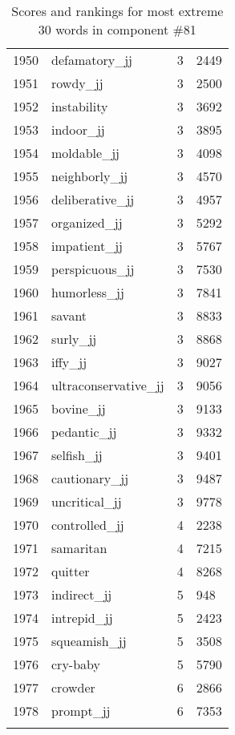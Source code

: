 \begin{longtable}[!htbp]{| rlr@{.}l |}
    1950 & defamatory\_jj & 3 & 2449 \\
    1951 & rowdy\_jj & 3 & 2500 \\
    1952 & instability & 3 & 3692 \\
    1953 & indoor\_jj & 3 & 3895 \\
    1954 & moldable\_jj & 3 & 4098 \\
    1955 & neighborly\_jj & 3 & 4570 \\
    1956 & deliberative\_jj & 3 & 4957 \\
    1957 & organized\_jj & 3 & 5292 \\
    1958 & impatient\_jj & 3 & 5767 \\
    1959 & perspicuous\_jj & 3 & 7530 \\
    1960 & humorless\_jj & 3 & 7841 \\
    1961 & savant & 3 & 8833 \\
    1962 & surly\_jj & 3 & 8868 \\
    1963 & iffy\_jj & 3 & 9027 \\
    1964 & ultraconservative\_jj & 3 & 9056 \\
    1965 & bovine\_jj & 3 & 9133 \\
    1966 & pedantic\_jj & 3 & 9332 \\
    1967 & selfish\_jj & 3 & 9401 \\
    1968 & cautionary\_jj & 3 & 9487 \\
    1969 & uncritical\_jj & 3 & 9778 \\
    1970 & controlled\_jj & 4 & 2238 \\
    1971 & samaritan & 4 & 7215 \\
    1972 & quitter & 4 & 8268 \\
    1973 & indirect\_jj & 5 & 948 \\
    1974 & intrepid\_jj & 5 & 2423 \\
    1975 & squeamish\_jj & 5 & 3508 \\
    1976 & cry-baby & 5 & 5790 \\
    1977 & crowder & 6 & 2866 \\
    1978 & prompt\_jj & 6 & 7353 \\
    \hline
    \caption{Scores and rankings for most extreme 30 words in component \#81} \\
\end{longtable}
